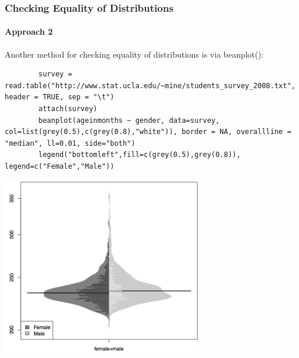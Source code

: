 \begin{frame}
\frametitle{Checking Equality of Distributions}
\framesubtitle{Approach 2}

Another method for checking equality of distributions is via \ttfamily beanplot(): \normalfont

	\begin{lstlisting}
		survey = read.table("http://www.stat.ucla.edu/~mine/students_survey_2008.txt", header = TRUE, sep = "\t")
		attach(survey)
		beanplot(ageinmonths ~ gender, data=survey, col=list(grey(0.5),c(grey(0.8),"white")), border = NA, overallline = "median", ll=0.01, side="both")
		legend("bottomleft",fill=c(grey(0.5),grey(0.8)), legend=c("Female","Male"))
	\end{lstlisting}
	
        \begin{center}
	         \includegraphics[width=0.65\textwidth]{images/beanplotSurvey.png}
        \end{center}
\end{frame}


